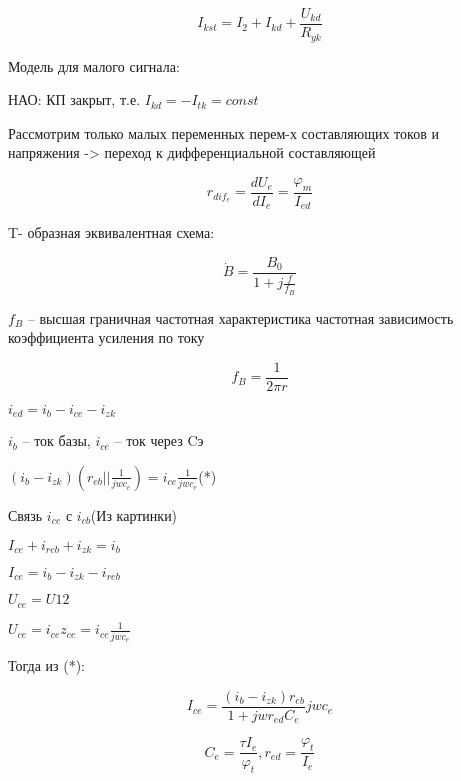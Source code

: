 $$I_{kst} = I_2 + I_{kd}  + \frac{U_{kd}}{R_{yk}}$$

Модель для малого сигнала: 

НАО: КП закрыт, т.е. $I_{kd}=-I_{tk}=const$

Рассмотрим только малых переменных перем-х составляющих токов и напряжения -> переход к дифференциальной составляющей
\begin{center}
\begin{figure}[h!]
		\label{VAX2}
	\end{figure}
\end{center}

$$r_{dif_e} = \frac{dU_{e}}{ dI_e }=\frac{\varphi_m}{ I_{ed} }$$

T- образная эквивалентная схема:
\begin{center}
\begin{figure}[h!]
		\label{T-obr}
	\end{figure}
\end{center}
$$
\dot{B}=\frac{B_0}{1+j\frac{f}{f_B}}
$$

$f_B$ – высшая граничная частотная характеристика
частотная зависимость коэффициента усиления по току 

$$
f_B=\frac{1}{2\pi r}
$$

$i_{ed} = i_b - i_{ce} - i_{zk}$

$i_b$ – ток базы, $i_{ce}$ – ток через Cэ

$(i_b - i_{zk})(r_{eb}||\frac{1}{jwc_e})= i_{ce}\frac{1}{jwc_e}$(*)

\begin{center}
\begin{figure}[h!]
		\label{}
	\end{figure}
\end{center}
Связь $i_{ce}$ с $i_{cb}$(Из картинки)

$I_{ce}+i_{reb} + i_{zk}=i_b$

$I_{ce}= i_b -  i_{zk} - i_{reb}$

$U_{ce} = U12$

$U_{ce}=i_{ce}z_{ce}= i_{ce}\frac{1}{jwc_e}$

Тогда из (*):

$$
I_{ce} = \frac{(i_b - i_{zk})r_{eb}}{1+jwr_{ed} C_e}jwc_e
$$

$$
C_e=\frac{\tau I_e}{\varphi_t}, r_{ed}=\frac{\varphi_t }{ I_e }
$$

